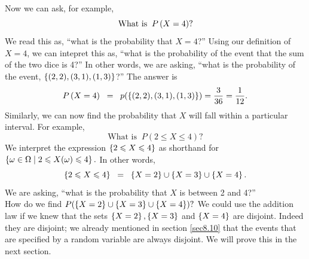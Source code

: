 \noindent Now we can ask, for example,
\[
\text{What is} \;\; P\left(X = 4\right)?
\]
We read this as, ``what is the probability that $X = 4$?'' Using our definition of $X = 4$, we can intepret this as, ``what is the probability of the event that the sum of the two dice is 4?'' In other words, we are asking, ``what is the probability of the event, $\left\{(2,2),(3,1),(1,3)\right\}$?'' The answer is
\[
P\left(X = 4\right) \;\; = \;\; p(\left\{(2,2),(3,1),(1,3)\right\}) = \frac{3}{36} = \frac{1}{12}.
\]
Similarly, we can now find the probability that $X$ will fall within a particular interval. For example,
\[
\text{What is} \;\; P(2 \leq X \leq 4)?
\]
We interpret the expression $\left\{2 \leqslant X \leqslant 4\right\}$ as shorthand for $\left\{\omega \in \Omega \mid 2 \leqslant X(\omega) \leqslant 4\right\}.$ In other words,
\[
\left\{2 \leqslant X \leqslant 4\right\} \;\; = \;\; \left\{X = 2\right\} \cup \left\{X = 3\right\} \cup \left\{X = 4\right\}.
\]
We are asking, ``what is the probability that $X$ is between 2 and 4?'' \\

\noindent How do we find $P(\left\{X = 2\right\} \cup \left\{X = 3\right\} \cup \left\{X = 4\right\})?$ We could use the addition law if we knew that the sets $\left\{X = 2\right\}, \left\{X = 3\right\}$ and $\left\{X = 4\right\}$ are disjoint. Indeed they are disjoint; we already mentioned in section \ref{sec8.10} that the events that are specified by a random variable are always disjoint. We will prove this in the next section.

